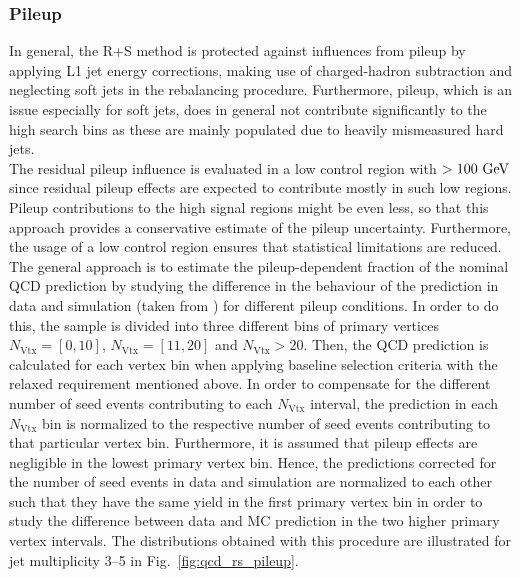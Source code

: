 \subsubsection*{Pileup} 
In general, the R+S method is protected against influences from pileup by applying L1 jet energy corrections, making use of charged-hadron subtraction and neglecting soft jets in the rebalancing procedure. Furthermore, pileup, which is an issue especially for soft jets, does in general not contribute significantly to the high \MHT search bins as these are mainly populated due to heavily mismeasured hard jets. \\
The residual pileup influence is evaluated in a low \MHT control region with \MHT $> 100 \rm{~GeV}$ since residual pileup effects are expected to contribute mostly in such low \MHT regions. Pileup contributions to the high \MHT signal regions might be even less, so that this approach provides a conservative estimate of the pileup uncertainty. Furthermore, the usage of a low \MHT control region ensures that statistical limitations are reduced.\\
The general approach is to estimate the pileup-dependent fraction of the nominal QCD prediction by studying the difference in the behaviour of the prediction in data and simulation (taken from \madgraph) for different pileup conditions. In order to do this, the sample is divided into three different bins of primary vertices $N_\mathrm{Vtx} = [0, 10]$, $N_\mathrm{Vtx} = [11, 20]$ and $N_\mathrm{Vtx} > 20$. Then, the QCD prediction is calculated for each vertex bin when applying baseline selection criteria with the relaxed \MHT requirement mentioned above. In order to compensate for the different number of seed events contributing to each $N_\mathrm{Vtx}$ interval, the prediction in each $N_\mathrm{Vtx}$ bin is normalized to the respective number of seed events contributing to that particular vertex bin. Furthermore, it is assumed that pileup effects are negligible in the lowest primary vertex bin. Hence, the predictions corrected for the number of seed events in data and simulation are normalized to each other such that they have the same yield in the first primary vertex bin in order to study the difference between data and MC prediction in the two higher primary vertex intervals. The distributions obtained with this procedure are illustrated for jet multiplicity 3--5 in Fig.~\ref{fig:qcd_rs_pileup}. 
